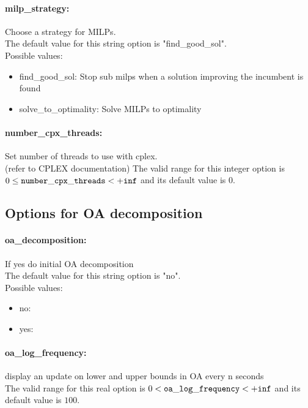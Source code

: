 \paragraph{milp\_strategy:}\label{sec:milp_strategy} Choose a strategy for MILPs. $\;$ \\

The default value for this string option is "find\_good\_sol".
\\ 
Possible values:
\begin{itemize}
   \item find\_good\_sol: Stop sub milps when a solution improving the
incumbent is found
   \item solve\_to\_optimality: Solve MILPs to optimality
\end{itemize}

\paragraph{number\_cpx\_threads:}\label{sec:number_cpx_threads} Set number of threads to use with cplex. $\;$ \\
 (refer to CPLEX documentation) The valid range for this integer option is
$0 \le {\tt number\_cpx\_threads } <  {\tt +inf}$
and its default value is $0$.


\subsection{Options for OA decomposition}
\label{sec:Options_for_OA_decomposition}
\paragraph{oa\_decomposition:}\label{sec:oa_decomposition} If yes do initial OA decomposition $\;$ \\

The default value for this string option is "no".
\\ 
Possible values:
\begin{itemize}
   \item no: 
   \item yes: 
\end{itemize}

\paragraph{oa\_log\_frequency:}\label{sec:oa_log_frequency} display an update on lower and upper bounds in OA every n seconds $\;$ \\
 The valid range for this real option is 
$0 <  {\tt oa\_log\_frequency } <  {\tt +inf}$
and its default value is $100$.


